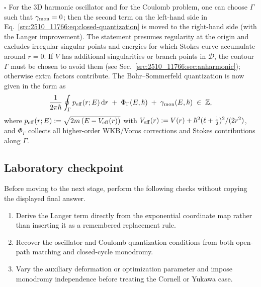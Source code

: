 \hfill$\square$
For the 3D harmonic oscillator and for the Coulomb problem, one can choose $\Gamma$ such that $\gamma_{\mathrm{mon}}=0$; then the second term on the left-hand side in Eq.~\eqref{src:2510_11766:eq:closed-quantization} is moved to the right-hand side (with the Langer improvement).
The statement presumes regularity at the origin and excludes irregular singular points and energies for which Stokes curve accumulate around $r=0$.
If $V$ has additional singularities or branch points in $\mathcal D$, the contour $\Gamma$ must be chosen to avoid them (see Sec.~\ref{src:2510_11766:sec:anharmonic}); otherwise extra factors contribute.
The Bohr--Sommerfeld quantization is now given in the form as
\begin{equation}
\label{src:2510_11766:eq:QC-practical}
\frac{1}{2\pi\hbar}\oint_\Gamma p_{\mathrm{eff}}(r;E)\,\mathrm{d} r
\;+\; \Phi_\Gamma(E,\hbar) \;+\; \gamma_{\mathrm{mon}}(E,\hbar)\;\in\; \mathbb Z,
\end{equation}
where
$p_{\mathrm{eff}}(r;E):=\sqrt{2m\,(E-V_{\mathrm{eff}}(r))}$ with $V_{\mathrm{eff}}(r):=V(r)+\hbar^2(\ell+\tfrac12)^2/(2r^2)$, and $\Phi_\Gamma$ collects all higher-order WKB/Voros corrections and Stokes contributions along $\Gamma$.

\subsection*{Laboratory checkpoint}
Before moving to the next stage, perform the following checks without copying
the displayed final answer.
\begin{enumerate}
  \item Derive the Langer term directly from the exponential coordinate map rather than inserting it as a remembered replacement rule.
  \item Recover the oscillator and Coulomb quantization conditions from both open-path matching and closed-cycle monodromy.
  \item Vary the auxiliary deformation or optimization parameter and impose monodromy independence before treating the Cornell or Yukawa case.
\end{enumerate}
